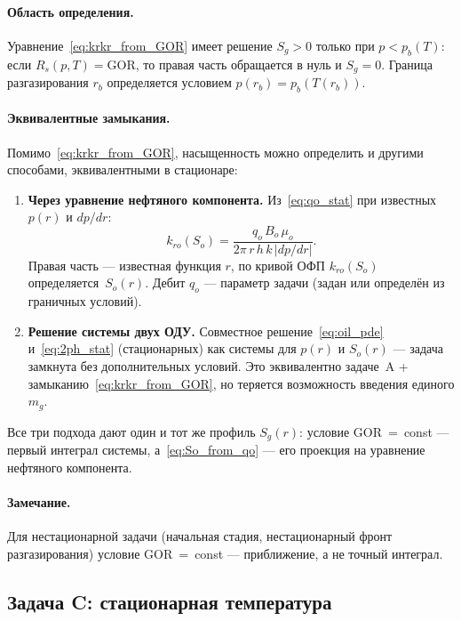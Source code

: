﻿\documentclass[12pt,a4paper]{article}
\begin{document}
\paragraph{Область определения.}
Уравнение~\eqref{eq:krkr_from_GOR} имеет решение
$S_g > 0$ только при $p < p_b(T)$: если $R_s(p,T)
= \mathrm{GOR}$, то правая часть обращается в нуль
и $S_g = 0$. Граница разгазирования $r_b$ определяется
условием $p(r_b) = p_b(T(r_b))$.

\paragraph{Эквивалентные замыкания.}
Помимо~\eqref{eq:krkr_from_GOR}, насыщенность можно
определить и другими способами, эквивалентными
в стационаре:
\begin{enumerate}[nosep]
  \item \textbf{Через уравнение нефтяного компонента.}
        Из~\eqref{eq:qo_stat} при известных $p(r)$
        и $dp/dr$:
        \begin{equation}\label{eq:So_from_qo}
          k_{ro}(S_o) = \frac{q_o\,B_o\,\mu_o}
          {2\pi\,r\,h\,k\,|dp/dr|}.
        \end{equation}
        Правая часть --- известная функция $r$, по
        кривой ОФП $k_{ro}(S_o)$ определяется~$S_o(r)$.
        Дебит $q_o$ --- параметр задачи (задан или
        определён из граничных условий).
  \item \textbf{Решение системы двух ОДУ.}
        Совместное решение~\eqref{eq:oil_pde}
        и~\eqref{eq:2ph_stat} (стационарных) как
        системы для $p(r)$ и $S_o(r)$ --- задача
        замкнута без дополнительных условий. Это
        эквивалентно задаче~A + замыканию~\eqref{eq:krkr_from_GOR},
        но теряется возможность введения единого $m_g$.
\end{enumerate}
Все три подхода дают один и тот же профиль $S_g(r)$:
условие GOR~=~const --- первый интеграл системы,
а~\eqref{eq:So_from_qo} --- его проекция на уравнение
нефтяного компонента.

\paragraph{Замечание.}
Для нестационарной задачи (начальная стадия,
нестационарный фронт разгазирования) условие
GOR~=~const --- приближение, а не точный интеграл.

\subsection{Задача C: стационарная температура}\label{ssec:temperature}
\end{document}

